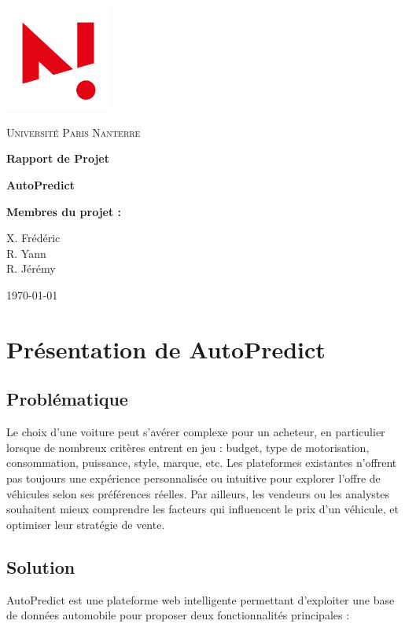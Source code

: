 \documentclass[12pt]{report}
\begin{document}
\begin{titlepage}
    \centering
    \includegraphics[width=3.5cm]{Logo_nanterre.png}\par\vspace{1cm}
    {\scshape\LARGE Université Paris Nanterre\par}
    \vspace{0.5cm}
    {\huge\bfseries Rapport de Projet\par}
    \vspace{0.5cm}
    {\Huge\bfseries AutoPredict\par}
    \vspace{1.5cm}
    {\Large \textbf{Membres du projet :} \par}
    \vspace{0.3cm}
    {\Large X. Frédéric \\ R. Yann \\ R. Jérémy \par}
    \vfill
    {\large \today\par}
\end{titlepage}

\tableofcontents

\chapter{Présentation de AutoPredict}
\section{Problématique}
Le choix d’une voiture peut s’avérer complexe pour un acheteur, en particulier lorsque de nombreux critères entrent en jeu : budget, type de motorisation, consommation, puissance, style, marque, etc. Les plateformes existantes n’offrent pas toujours une expérience personnalisée ou intuitive pour explorer l’offre de véhicules selon ses préférences réelles. Par ailleurs, les vendeurs ou les analystes souhaitent mieux comprendre les facteurs qui influencent le prix d’un véhicule, et optimiser leur stratégie de vente.


\section{Solution}
AutoPredict est une plateforme web intelligente permettant d’exploiter une base de données automobile pour proposer deux fonctionnalités principales :
\end{document}
